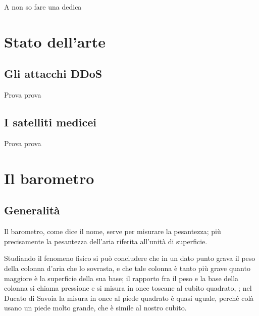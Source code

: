 \documentclass[%
corpo=12pt,
twoside,
stile=standard,
tipotesi=magistrale,
numerazioneromana,
greek,
evenboxes,
]{toptesi}
\begin{document}
\ifclassica%
{\begin{dedica}
A non so fare una dedica

\end{dedica}
\fi


\italiano

\indici


\mainmatter







\chapter{Stato dell'arte}

\section{Gli attacchi DDoS}
Prova prova

\section{I satelliti medicei}
Prova prova

\chapter{Il barometro}
\section{Generalit\`a}
\begin{interlinea}{0.87} Il barometro, come dice il nome, serve per
misurare la pesantezza; pi\`u precisamente la pesantezza dell'aria
riferita all'unit\`a di superficie.
\end{interlinea}

\begin{interlinea}{2} Studiando il fenomeno fisico si pu\`o concludere
che in un dato punto grava il peso della colonna d'aria che lo
sovrasta, e che tale colonna \`e tanto pi\`u grave quanto maggiore
\`e la superficie della sua base; il rapporto fra il peso e la base
della colonna si chiama pressione e si misura in once toscane al cubito
quadrato, \cite{tor1}; nel Ducato di Savoia la misura in once al piede
quadrato \`e quasi uguale, perch\'e col\`a usano un piede molto
grande, che \`e simile al nostro cubito.
\end{interlinea}

}
\end{document}
